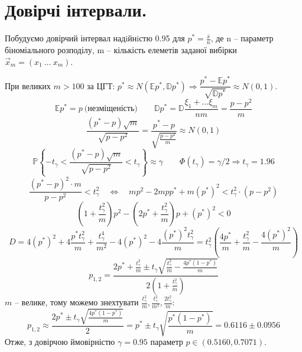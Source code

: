 \documentclass[14pt,a4paper]{scrartcl}
\theoremstyle{definition}
\theoremstyle{remark}
\theoremstyle{definition}
\theoremstyle{definition}
\begin{document}
\section{Довірчі інтервали.}
Побудуємо довірчий інтервал надiйнiстю 0.95 для \( p^* = \frac{\overline{x}}{n} \), де n -- параметр біноміального розподілу, m -- кількість елеметів заданої вибірки \( \overrightarrow{x}_m = (x_1 \ \dots \ x_m) \).\par
При великих $m > 100$ за ЦГТ: \( p^* \approx N(\mathbb{E} p^*, \mathbb{D}p^*)  \Longrightarrow  \dfrac{p^* - \mathbb{E} p^*}{\sqrt{\mathbb{D}p^*}} \approx N(0,1)\).
\[
 \mathbb{E} p^* = p \ \text{(незміщеність)} \qquad \mathbb{D}p^* = \mathbb{D} \frac{\xi_1 + \dots \xi_m}{nm} = \frac{p - p^2}{m}
\]
\[
 \frac{(p^* - p)\sqrt{m}}{\sqrt{p - p^2}}  = \frac{p^* - p}{\sqrt{\frac{p - p^2}{m}}} \approx N(0,1)
\]
\[
\mathbb{P} \left\lbrace - t_{\gamma} <  \frac{(p^* - p)\sqrt{m}}{\sqrt{p - p^2}}  < t_{\gamma}  \right\rbrace \approx \gamma \qquad \Phi(t_\gamma) = \gamma/2 \Rightarrow t_{\gamma} = 1.96
\]
\[
  \frac{(p^* - p)^2 \cdot m }{p - p^2} < t_{\gamma}^2
  \quad \Longleftrightarrow  \quad
    mp^2 - 2mpp^* + m(p^*)^2 < t_{\gamma}^2\cdot(p - p^2)
\]
\[
    \left( 1 + \frac{ t_{\gamma}^2}{m} \right) p^2 - \left(2 p^* + \frac{ t_{\gamma}^2}{m} \right)p + (p^*)^2 < 0
\]
\def\tg{t_{\gamma}}
\def\pp{p^*}
\[
 D = 4 (p^*)^2 + 4 \frac{p^* t_{\gamma}^2}{m} +  \frac{ t_{\gamma}^4}{m^2} - 4 (p^*)^2 - 4  \frac{(p^*)^2 t_{\gamma}^2}{m} = t_{\gamma}^2 \left( \frac{4p^*}{m} + \frac{t_{\gamma}^2}{m} - \frac{4(p^*)^2}{m}  \right)
\]
\[
 p_{1,2} = \frac{2p^* + \frac{t_{\gamma}^2}{m} \pm \tg \sqrt{\frac{t_{\gamma}^2}{m} - \frac{4p^*(1 -\pp)}{m}} }{2 \left( 1 + \frac{\tg^2}{m} \right)}
\]
$m$ -- велике, тому можемо знехтувати \( \frac{\tg^2}{m}, \frac{\tg^2}{m^2}, \frac{2\tg^2}{m} \):
\[
 p_{1,2} \approx \frac{2p^* \pm \tg \sqrt{\frac{4p^*(1 -\pp)}{m}} }{2} = p^* \pm \tg \sqrt{\frac{p^*(1 -\pp)}{m}} = 0.6116 \pm 0.0956
\]
Отже, з довірчою ймовірністю \( \gamma = 0.95 \) параметр \( p \in (0.5160, 0.7071) \).
\newpage
\end{document}
